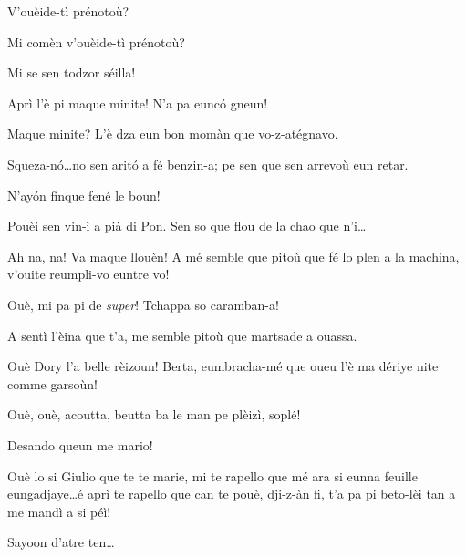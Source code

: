 \begin{drama}


\Dorinaspeaks{} V'ouèide-tì prénotoù?

\Federicospeaks{} Mi comèn v'ouèide-tì prénotoù? 

\Marcospeaks Mi se sen todzor séilla! 

\Michelspeaks Aprì l'è pi maque minite! N'a pa eunc\'o gneun!

\Bertaspeaks Maque minite? L'è dza eun bon momàn que vo-z-atégnavo.

\Federicospeaks{} Squeza-n\'o\ldots no sen arit\'o a fé benzin-a; pe sen que sen arrevoù eun retar.

\Marcospeaks N'ay\'on finque fené le boun!

\Michelspeaks Pouèi sen vin-ì a pià di Pon.  Sen so que flou de la chao que n'i\ldots


\Dorinaspeaks Ah na, na! Va maque llouèn! A mé semble que pitoù que fé lo plen a la machina, v'ouite reumpli-vo euntre vo!

\Federicospeaks Ouè, mi pa pi de \textit{super}!  Tchappa so caramban-a!

\Dorinaspeaks A sentì l’èina que t’a, me semble pitoù que martsade a ouassa.


\Giuliospeaks Ouè Dory l’a belle rèizoun! Berta, eumbracha-mé que oueu l’è ma dériye nite comme garsoùn!

\Bertaspeaks{} Ouè, ouè, acoutta, beut\-ta ba le man pe plèizì, soplé!


\Giuliospeaks{} Desando queun me mario!

\Bertaspeaks{} Ouè lo si Giulio que te te marie, mi te rapello que mé ara si eunna feuille eungadjaye\ldots é aprì te rapello que can te pouè, dji-z-àn fi, t'a pa pi beto-lèi tan a me mandì a si péì!

\Giuliospeaks Sayoon d'atre ten\ldots


\end{drama}

